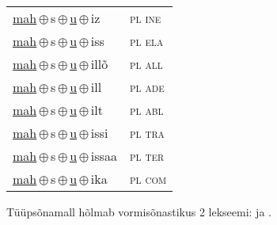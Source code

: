 \begin{minipage}{\textwidth}
\begin{sideways}
\begin{tabular}{l l}
\underline{mah}\,$\oplus$\,s\,$\oplus$\,\underline{u}\,$\oplus$\,iz & \textsc{ pl ine } \\
\underline{mah}\,$\oplus$\,s\,$\oplus$\,\underline{u}\,$\oplus$\,iss & \textsc{ pl ela } \\
\underline{mah}\,$\oplus$\,s\,$\oplus$\,\underline{u}\,$\oplus$\,illõ & \textsc{ pl all } \\
\underline{mah}\,$\oplus$\,s\,$\oplus$\,\underline{u}\,$\oplus$\,ill & \textsc{ pl ade } \\
\underline{mah}\,$\oplus$\,s\,$\oplus$\,\underline{u}\,$\oplus$\,ilt & \textsc{ pl abl } \\
\underline{mah}\,$\oplus$\,s\,$\oplus$\,\underline{u}\,$\oplus$\,issi & \textsc{ pl tra } \\
\underline{mah}\,$\oplus$\,s\,$\oplus$\,\underline{u}\,$\oplus$\,issaa & \textsc{ pl ter } \\
\underline{mah}\,$\oplus$\,s\,$\oplus$\,\underline{u}\,$\oplus$\,ika & \textsc{ pl com } \\
\end{tabular}
\end{sideways}
\label{tab:tüüpsõnamall-mahsu}

\end{minipage}

 
\vspace{1em}
\noindent Tüüpsõnamall  hõlmab vormisõnastikus 2 lekseemi:  ja .
